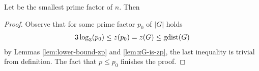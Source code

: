 
\begin{lem}
Let be the smallest prime factor of $n$. Then
%
\end{lem}%
\begin{proof}
Observe that for some prime factor $p_0$ of $|G|$ holds
\begin{align}
	3 \log_3(p_0) \leq z(p_0) = z(G) \leq \mathop{\mathrm{gdist}}(G)
\end{align}
by Lemmas \ref{lem:lower-bound-zp} and \ref{lem:zG-is-zp}, the last inequality is trivial from definition. The fact that $p \leq p_0$ finishes the proof.
\end{proof}
